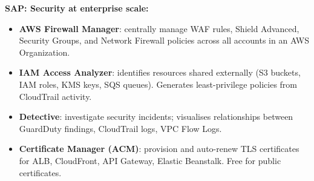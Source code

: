 \begin{sapdepth}
\textbf{SAP: Security at enterprise scale:}
\begin{itemize}
  \item \textbf{AWS Firewall Manager}: centrally manage WAF rules, Shield Advanced, Security Groups,
        and Network Firewall policies across all accounts in an AWS Organization.
  \item \textbf{IAM Access Analyzer}: identifies resources shared externally (S3 buckets, IAM roles,
        KMS keys, SQS queues). Generates least-privilege policies from CloudTrail activity.
  \item \textbf{Detective}: investigate security incidents; visualises relationships between
        GuardDuty findings, CloudTrail logs, VPC Flow Logs.
  \item \textbf{Certificate Manager (ACM)}: provision and auto-renew TLS certificates for
        ALB, CloudFront, API Gateway, Elastic Beanstalk. Free for public certificates.
\end{itemize}
\end{sapdepth}
